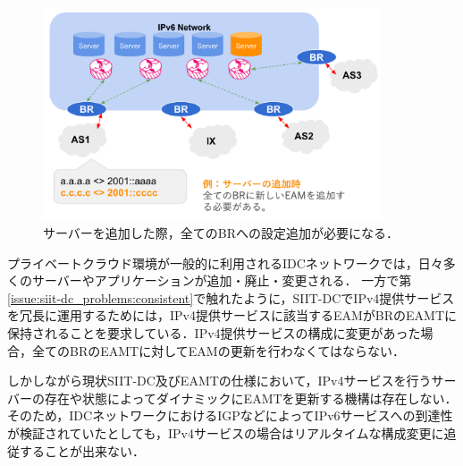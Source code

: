 \begin{figure}[h]
    \begin{center}
      \includegraphics[width=10cm,pagebox=cropbox,clip]{img/siit-dc_add-server.png}
    \end{center}
    \caption{サーバーを追加した際，全てのBRへの設定追加が必要になる．}
    \label{fig:siit-dc_add-server}
\end{figure}

プライベートクラウド環境が一般的に利用されるIDCネットワークでは，日々多くのサーバーやアプリケーションが追加・廃止・変更される．
一方で第\ref{issue:siit-dc_problems:consistent}で触れたように，SIIT-DCでIPv4提供サービスを冗長に運用するためには，IPv4提供サービスに該当するEAMがBRのEAMTに保持されることを要求している．IPv4提供サービスの構成に変更があった場合，全てのBRのEAMTに対してEAMの更新を行わなくてはならない．

しかしながら現状SIIT-DC及びEAMTの仕様\cite{RFC7755,RFC7756,RFC7757}において，IPv4サービスを行うサーバーの存在や状態によってダイナミックにEAMTを更新する機構は存在しない．そのため，IDCネットワークにおけるIGPなどによってIPv6サービスへの到達性が検証されていたとしても，IPv4サービスの場合はリアルタイムな構成変更に追従することが出来ない．



